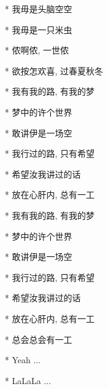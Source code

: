 \documentclass[UTF8]{ctexart}
\begin{document}
\begin{center}
\begin{enumerate}
            \pagebreak

            \item[]
            \item[] \chorus
            \item[*]我毋是头脑空空
            \item[*]我毋是一只米虫
            \item[*]侬啊侬, 一世侬
            \item[*]欲按怎欢喜, 过春夏秋冬
            \item[*]我有我的路, 有我的梦
            \item[*]梦中的许个世界
            \item[*]敢讲伊是一场空
            \item[*]我行过的路, 只有希望
            \item[*]希望汝我讲过的话
            \item[*]放在心肝内, 总有一工

            \item[]
            \item[] \chorus
            \item[*] 我有我的路, 有我的梦
            \item[*] 梦中的许个世界
            \item[*] 敢讲伊是一场空
            \item[*] 我行过的路, 只有希望
            \item[*] 希望汝我讲过的话
            \item[*] 放在心肝内, 总有一工
            \item[*] 总会总会有一工
            \item[*] Yeah ...
            \item[*] LaLaLa ...

        \end{enumerate}
    \end{center}
\end{document}
